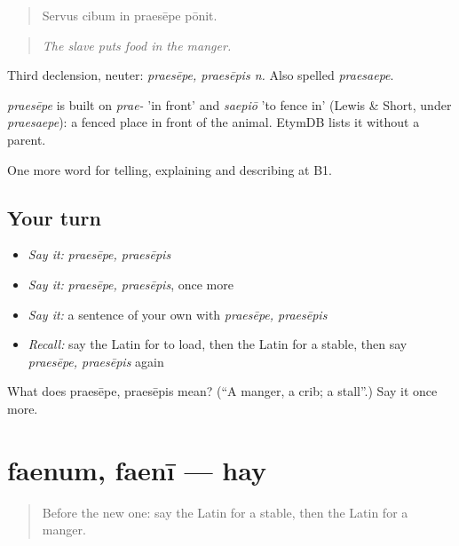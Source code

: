 \begin{quote}
Servus cibum in praesēpe pōnit.
\end{quote}

\begin{quote}
\emph{The slave puts food in the manger.}
\end{quote}

Third declension, neuter: \emph{praesēpe, praesēpis n.} Also spelled \emph{praesaepe}.

\begin{cousinweb}
\emph{praesēpe} is built on \emph{prae-} 'in front' and \emph{saepiō} 'to fence in' (Lewis \& Short, under \emph{praesaepe}): a fenced place in front of the animal. EtymDB lists it without a parent.
\end{cousinweb}

\begin{grammarlens}[title={What you've built}]
One more word for telling, explaining and describing at B1.
\end{grammarlens}

\subsection*{Your turn}
\begin{itemize}
\raggedright
  \item \emph{Say it:} \emph{praesēpe, praesēpis}
  \item \emph{Say it:} \emph{praesēpe, praesēpis}, once more
  \item \emph{Say it:} a sentence of your own with \emph{praesēpe, praesēpis}
  \item \emph{Recall:} say the Latin for to load, then the Latin for a stable, then say \emph{praesēpe, praesēpis} again
\end{itemize}

\begin{tcolorbox}[breakable,colback=teal!4,colframe=teal!35!black,title={Before you move on}]
What does praesēpe, praesēpis mean? (\textquotedblleft{}A manger, a crib; a stall\textquotedblright{}.) Say it once more.
\end{tcolorbox}
\section[faenum, faenī]{faenum, faenī — hay}

\label{lesson:LA-C434-faenum}



\begin{quote}
Before the new one: say the Latin for a stable, then the Latin for a manger.
\end{quote}

